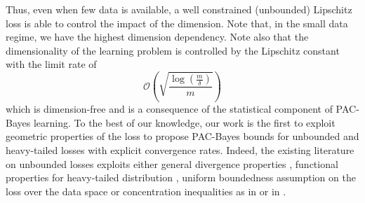 Thus, even when few data is available, a well constrained (unbounded) Lipschitz loss is able to control the impact of the dimension.
Note that, in the small data regime, we have the highest dimension dependency. Note also that the dimensionality of the learning problem is controlled by the Lipschitz constant with the limit rate of $$\mathcal{O}\left(\sqrt{\frac{\log\left( \frac{m}{\delta} \right)}{m}}\right)$$ which is dimension-free and is a consequence of the statistical component of PAC-Bayes learning.
To the best of our knowledge, our work is the first to exploit geometric properties of the loss to propose PAC-Bayes bounds for unbounded and heavy-tailed losses with explicit convergence rates. Indeed, the existing literature on unbounded losses exploits either general divergence properties \citep{alquier2018simpler,picard2022change}, functional properties for heavy-tailed distribution \citep{holland2019pac}, uniform boundedness assumption on the loss over the data space \citep{haddouche2021pac} or concentration inequalities as in  or in \citet{kuzborskij2019efron,rivasplata2020pac,jang2023tight}.

